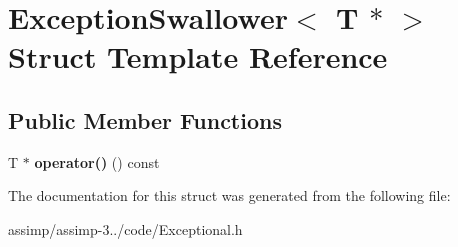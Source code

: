 \hypertarget{struct_exception_swallower_3_01_t_01_5_01_4}{\section{Exception\+Swallower$<$ T $\ast$ $>$ Struct Template Reference}
\label{struct_exception_swallower_3_01_t_01_5_01_4}
}
\subsection*{Public Member Functions}
\begin{DoxyCompactItemize}
\item 
\hypertarget{struct_exception_swallower_3_01_t_01_5_01_4_ae2dfead4b4469e6d497401f95696d07e}{T $\ast$ {\bfseries operator()} () const }\label{struct_exception_swallower_3_01_t_01_5_01_4_ae2dfead4b4469e6d497401f95696d07e}

\end{DoxyCompactItemize}


The documentation for this struct was generated from the following file\+:\begin{DoxyCompactItemize}
\item 
assimp/assimp-\/3../code/Exceptional.\+h\end{DoxyCompactItemize}
